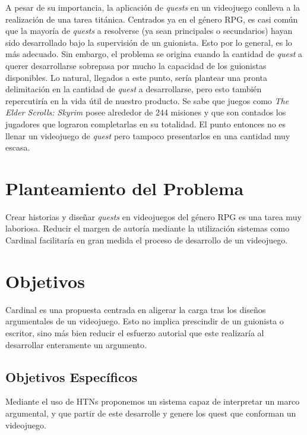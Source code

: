 A pesar de su importancia, la aplicación de \textit{quests} en un videojuego conlleva a la realización de una tarea titánica. Centrados ya en el género \ac{RPG}, es casi  común que la mayoría de \textit{quests} a resolverse (ya sean principales o secundarios) hayan sido desarrollado bajo la supervisión de un guionista. Esto por lo general, es lo más adecuado. Sin embargo, el problema se origina cuando la cantidad de \textit{quest} a querer desarrollarse sobrepasa por mucho la capacidad de los guionistas disponibles. Lo natural, llegados a este punto, sería plantear una pronta delimitación en la cantidad de \textit{quest} a desarrollarse, pero esto también repercutiría en la vida útil de nuestro producto. Se sabe que juegos como \textit{The Elder Scrolls: Skyrim} posee alrededor de 244 misiones y que son contados los jugadores que lograron completarlas en su totalidad. El punto entonces no es llenar un videojuego de \textit{quest} pero tampoco presentarlos en una cantidad muy escasa.

\section{Planteamiento del Problema}

Crear historias y diseñar \textit{quests} en videojuegos del género RPG es una tarea muy laboriosa. Reducir el margen de autoría mediante la utilización sistemas como Cardinal facilitaría en gran medida el proceso de desarrollo de un videojuego.


\section{Objetivos}

Cardinal es una propuesta centrada en aligerar la carga tras los diseños argumentales de un videojuego. Esto no implica prescindir de un guionista o escritor, sino más bien reducir el esfuerzo autorial que este realizaría al desarrollar enteramente un argumento.

\subsection{Objetivos Específicos}

Mediante el uso de HTNs proponemos un sistema capaz de interpretar un marco argumental, y que partir de este desarrolle y genere los quest que conforman un videojuego. 

